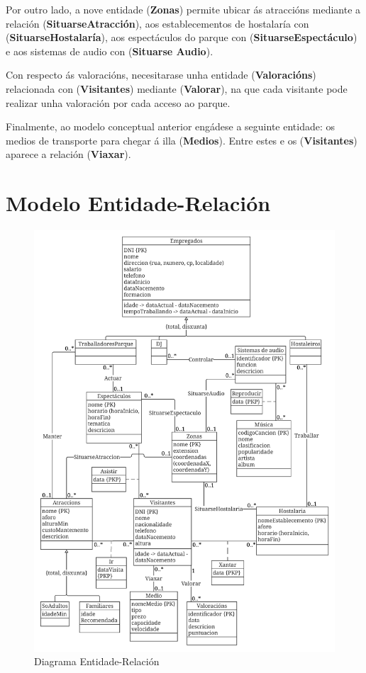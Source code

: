 \documentclass[12pt,a4paper]{book}
\theoremstyle{definition}
\theoremstyle{break}
\begin{document}
	Por outro lado, a nove entidade (\textbf{Zonas}) permite ubicar ás atraccións mediante a relación (\textbf{SituarseAtracción}), aos establecementos de hostalaría con (\textbf{SituarseHostalaría}), aos espectáculos do parque con (\textbf{SituarseEspectáculo}) e aos sistemas de audio con (\textbf{Situarse Audio}).
	
	Con respecto ás valoracións, necesitarase unha entidade (\textbf{Valoracións}) relacionada con (\textbf{Visitantes}) mediante (\textbf{Valorar}), na que cada visitante pode realizar unha valoración por cada acceso ao parque.
	
	Finalmente, ao modelo conceptual anterior engádese a seguinte entidade: os medios de transporte para chegar á illa (\textbf{Medios}). Entre estes e os (\textbf{Visitantes}) aparece a relación (\textbf{Viaxar}).
	
	
	\newpage
	
	\section{Modelo Entidade-Relación}
	
	\begin{figure} [H] \centering
		\caption{Diagrama Entidade-Relación}
		\includegraphics[width=\textwidth]{MER.pdf}
	\end{figure}
	\newpage
	
\end{document}
